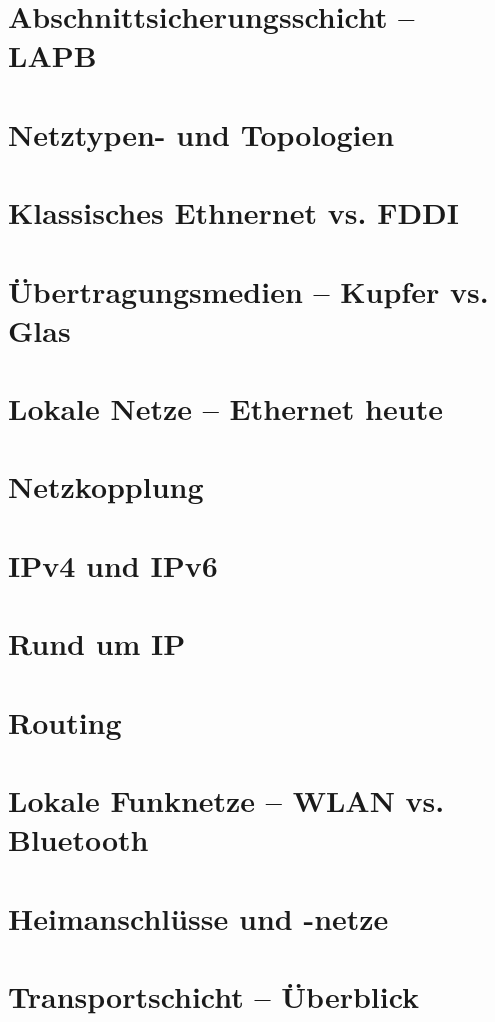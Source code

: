 \documentclass[hidelinks]{article}
\begin{document}
\section{Abschnittsicherungsschicht -- LAPB}

\section{Netztypen- und Topologien}

\section{Klassisches Ethnernet vs. FDDI}

\section{Übertragungsmedien -- Kupfer vs. Glas}

\section{Lokale Netze -- Ethernet heute}

\section{Netzkopplung}

\section{IPv4 und IPv6}

\section{Rund um IP}

\section{Routing}

\section{Lokale Funknetze -- WLAN vs. Bluetooth}

\section{Heimanschlüsse und -netze}

\section{Transportschicht -- Überblick}
\end{document}
